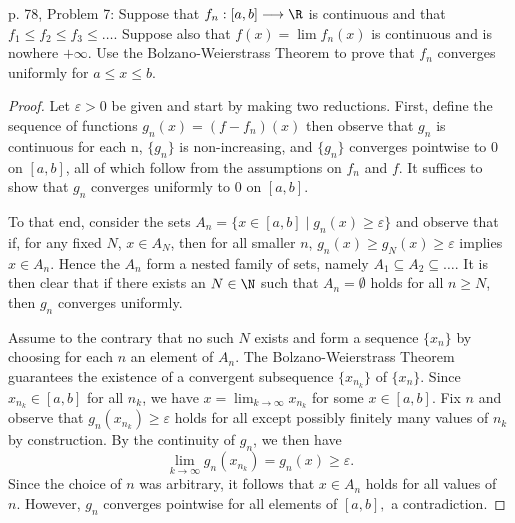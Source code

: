 \documentclass[10pt]{amsart}
\begin{document}
\begin{thm}{p. 78, Problem 7:}
  Suppose that $f_n:[a,b] \longrightarrow \R$ is continuous and that $f_1 \leq f_2 \leq f_3 \leq \ldots.$
  Suppose also that $f(x) = \lim f_n(x)$ is continuous and is nowhere $+\infty.$
  Use the Bolzano-Weierstrass Theorem to prove that $f_n$ converges uniformly for $a \leq x \leq b.$
  \begin{proof}
    Let $\varepsilon > 0 $ be given and start by making two reductions.
    First, define the sequence of functions $g_n(x) = (f - f_n)(x)$ then observe that $g_n$ is continuous for each n, $\{g_n\}$ is non-increasing, and $\{g_n\}$ converges pointwise to $0$ on $[a,b]$, all of which follow from the assumptions on $f_n$ and $f$.
    It suffices to show that $g_n$ converges uniformly to $0$ on $[a,b].$  

    To that end, consider the sets $A_n = \{x \in [a,b] \mid g_n(x) \geq \varepsilon\}$ and observe that if, for any fixed $N$, $x \in A_N$, then for all smaller $n$, $g_n(x) \geq g_N(x) \geq \varepsilon$ implies $x \in A_n.$
    Hence the $A_n$ form a nested family of sets, namely $A_1 \subseteq A_2 \subseteq \ldots$.
    It is then clear that if there exists an  $N \in \N$ such that $A_n = \emptyset$ holds for all $n \geq N$, then $g_n$ converges uniformly.

    Assume to the contrary that no such $N$ exists and form a sequence $\{x_n\}$ by choosing for each $n$ an element of $A_n.$
    The Bolzano-Weierstrass Theorem guarantees the existence of a convergent subsequence $\{x_{n_k}\}$ of $\{x_n\}.$
    Since $x_{n_k} \in [a,b]$ for all $n_k$, we have $x = \lim_{k \rightarrow \infty} x_{n_k}$ for some $x \in [a,b].$
    Fix $n$ and observe that $g_n(x_{n_k}) \geq \varepsilon$ holds for all except possibly finitely many values of $n_k$ by construction. 
    By the continuity of $g_n$, we then have $$\lim_{k \rightarrow \infty} g_n(x_{n_k}) = g_n(x) \geq \varepsilon.$$
    Since the choice of $n$ was arbitrary, it follows that $x \in A_n$ holds for all values of $n.$  
    However, $g_n$ converges pointwise for all elements of $[a,b],$ a contradiction.
  \end{proof}
\end{thm}
\end{document}
